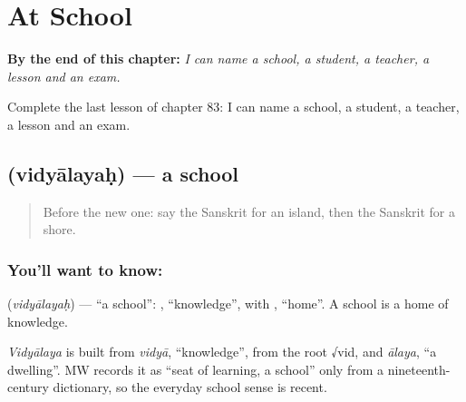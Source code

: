 
\chapter{At School}
\label{ch:sa-at-school}

\begin{chapteropening}
\textbf{By the end of this chapter:} \emph{I can name a school, a student, a teacher, a lesson and an exam.}

Complete the last lesson of chapter 83: I can name a school, a student, a teacher, a lesson and an exam.
\end{chapteropening}

\section[\texorpdfstring{\sk{विद्यालयः} (vidyālayaḥ)}{विद्यालयः (vidyālayaḥ)}]{ (vidyālayaḥ) — a school}

\label{lesson:SA-C83-school}



\begin{quote}
Before the new one: say the Sanskrit for an island, then the Sanskrit for a shore.
\end{quote}

\subsection*{You'll want to know: }
\textbf{} (\emph{vidyālayaḥ}) — \textquotedblleft{}a school\textquotedblright{}: \textbf{}, \textquotedblleft{}knowledge\textquotedblright{}, with \textbf{}, \textquotedblleft{}home\textquotedblright{}. A school is a home of knowledge.

\begin{cousinweb}
\emph{Vidyālaya} is built from \emph{vidyā}, \textquotedblleft{}knowledge\textquotedblright{}, from the root √vid, and \emph{ālaya}, \textquotedblleft{}a dwelling\textquotedblright{}. MW records it as \textquotedblleft{}seat of learning, a school\textquotedblright{} only from a nineteenth-century dictionary, so the everyday school sense is recent.
\end{cousinweb}

